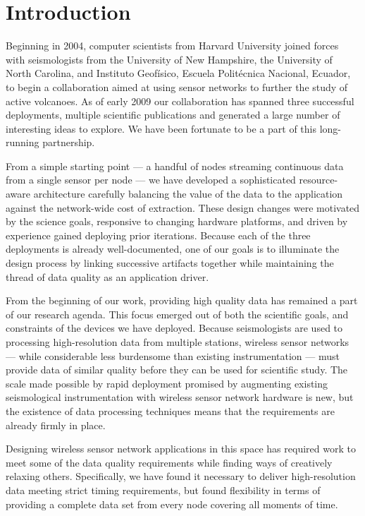 \chapter{Introduction}
\label{chap-introduction}

Beginning in 2004, computer scientists from Harvard University joined forces
with seismologists from the University of New Hampshire, the University of
North Carolina, and Instituto Geof\'{i}sico, Escuela Polit\'{e}cnica
Nacional, Ecuador, to begin a collaboration aimed at using sensor networks to
further the study of active volcanoes. As of early 2009 our collaboration has
spanned three successful deployments, multiple scientific publications and
generated a large number of interesting ideas to explore.  We have been
fortunate to be a part of this long-running partnership.

From a simple starting point --- a handful of nodes streaming continuous data
from a single sensor per node --- we have developed a sophisticated
resource-aware architecture carefully balancing the value of the data to the
application against the network-wide cost of extraction. These design changes
were motivated by the science goals, responsive to changing hardware
platforms, and driven by experience gained deploying prior iterations.
Because each of the three deployments is already well-documented, one of our
goals is to illuminate the design process by linking successive artifacts
together while maintaining the thread of data quality as an application
driver.

From the beginning of our work, providing high quality data has remained a
part of our research agenda. This focus emerged out of both the scientific
goals, and constraints of the devices we have deployed. Because seismologists
are used to processing high-resolution data from multiple stations, wireless
sensor networks --- while considerable less burdensome than existing
instrumentation --- must provide data of similar quality before they can be
used for scientific study.  The scale made possible by rapid deployment
promised by augmenting existing seismological instrumentation with wireless
sensor network hardware is new, but the existence of data processing
techniques means that the requirements are already firmly in place.

Designing wireless sensor network applications in this space has required
work to meet some of the data quality requirements while finding ways of
creatively relaxing others.  Specifically, we have found it necessary to
deliver high-resolution data meeting strict timing requirements, but found
flexibility in terms of providing a complete data set from every node
covering all moments of time.

